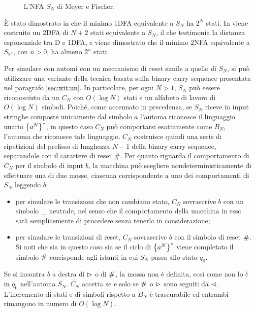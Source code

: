 \begin{figure}
	\centering
	
	\caption{L'NFA $S_N$ di Meyer e Fischer.}
	\label{img:wit:Sn}
\end{figure}

È stato dimostrato in \cite{Meyer:71:ecodescription} che il minimo 1DFA equivalente a $S_N$ ha $2^N$ stati. In \cite{Pighizzini:22:limitedwitness} viene costruito un 2DFA di $N+2$ stati equivalente a $S_N$, il che testimonia la distanza esponenziale tra D e 1DFA, e viene dimostrato che il minimo 2NFA equivalente a $S_{2^n}$, con $n>0$, ha almeno $2^n$ stati.

Per simulare con  automi con un meccanismo di reset simile a quello di $S_N$, si può utilizzare una variante della tecnica basata sulla binary carry sequence presentata nel paragrafo \ref{sec:wit:un}. In particolare, per ogni $N>1$, $S_N$ può essere riconosciuto da un  $C_N$ con $O(\log N)$ stati e un alfabeto di lavoro di $O(\log N)$ simboli.
Poiché, come accennato in precedenza, se $S_N$ riceve in input stringhe composte unicamente dal simbolo $a$ l'automa riconosce il linguaggio unario $\left\{ a^N \right\}^*$, in questo caso $C_N$ può comportarsi esattamente come $B_N$, l'automa che riconosce tale linguaggio. $C_N$ costruisce quindi una serie di ripetizioni del prefisso di lunghezza $N-1$ della binary carry sequence, separandole con il carattere di reset $\#$. Per quanto riguarda il comportamento di $C_N$ per il simbolo di input $b$, la macchina può scegliere nondeterministicamente di effettuare una di due mosse, ciascuna corrispondente a uno dei comportamenti di $S_N$ leggendo $b$:
\begin{itemize}
	\item per simulare le transizioni che non cambiano stato, $C_N$ sovrascrive $b$ con un simbolo $\_$ neutrale, nel senso che il comportamento della macchina in esso sarà semplicemente di procedere senza tenerlo in considerazione;
	\item per simulare le transizioni di reset, $C_N$ sovrascrive $b$ con il simbolo di reset $\#$. Si noti che sia in questo caso sia se il ciclo di $\left\{ a^N \right\}^*$ viene completato il simbolo $\#$ corrisponde agli istanti in cui $S_N$ passa allo stato $q_0$.
\end{itemize}
Se si incontra $b$ a destra di $\rhd$ o di $\#$, la mossa non è definita, così come non lo è in $q_0$ nell'automa $S_N$. $C_N$ accetta se e solo se $\#$ o $\rhd$ sono seguiti da $\lhd$. L'incremento di stati e di simboli rispetto a $B_N$ è trascurabile ed entrambi rimangono in numero di $O(\log N)$.

